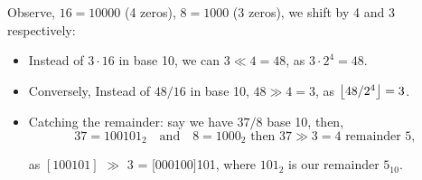 \newpage
\noindent
\begin{Example}

Observe, $16=10000$ (4 zeros), $8=1000$ (3 zeros), we shift by 4 and 3 respectively:
\begin{itemize}
    \item Instead of $3 \cdot 16$ in base 10, we can $3 \ll 4=48$, as $3 \cdot 2^4 = 48$.
    \item Conversely, Instead of $48/16$ in base 10, $48 \gg 4 = 3$, as $\floor*{48/2^4} = 3$.
    \item Catching the remainder: say we have $37/8$ base 10, then,
        \[ 37 = 100101_2 \quad \text{and} \quad 8 = 1000_2 \text{ then } 37 \gg 3 = 4 \text{ remainder } 5,\]

    \noindent    
    as  $[100101]$ $\gg$ 3 = [000100]101, where $101_2$ is our remainder $5_{10}$.
\end{itemize}


\end{Example}

